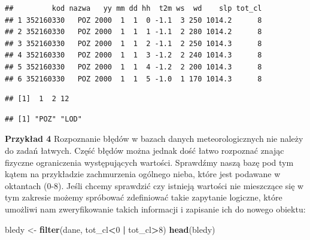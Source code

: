 \documentclass[]{book}
\newenvironment{Shaded}{\begin{snugshade}}{\end{snugshade}}
\newcommand{\KeywordTok}[1]{\textcolor[rgb]{0.13,0.29,0.53}{\textbf{#1}}}
\newcommand{\DecValTok}[1]{\textcolor[rgb]{0.00,0.00,0.81}{#1}}
\newcommand{\StringTok}[1]{\textcolor[rgb]{0.31,0.60,0.02}{#1}}
\newcommand{\CommentTok}[1]{\textcolor[rgb]{0.56,0.35,0.01}{\textit{#1}}}
\newcommand{\OperatorTok}[1]{\textcolor[rgb]{0.81,0.36,0.00}{\textbf{#1}}}
\newcommand{\NormalTok}[1]{#1}
\theoremstyle{definition}
\theoremstyle{definition}
\theoremstyle{definition}
\theoremstyle{remark}
\begin{document}
\begin{verbatim}
##         kod nazwa   yy mm dd hh  t2m ws  wd    slp tot_cl
## 1 352160330   POZ 2000  1  1  0 -1.1  3 250 1014.2      8
## 2 352160330   POZ 2000  1  1  1 -1.1  2 280 1014.2      8
## 3 352160330   POZ 2000  1  1  2 -1.1  2 250 1014.3      8
## 4 352160330   POZ 2000  1  1  3 -1.2  2 240 1014.3      8
## 5 352160330   POZ 2000  1  1  4 -1.2  2 200 1014.3      8
## 6 352160330   POZ 2000  1  1  5 -1.0  1 170 1014.3      8
\end{verbatim}

\begin{Shaded}
\end{Shaded}

\begin{verbatim}
## [1]  1  2 12
\end{verbatim}

\begin{Shaded}
\end{Shaded}

\begin{verbatim}
## [1] "POZ" "LOD"
\end{verbatim}

\textbf{Przykład 4} Rozpoznanie błędów w bazach danych meteorologicznych
nie należy do zadań łatwych. Część błędów można jednak dość łatwo
rozpoznać znając fizyczne ograniczenia występujących wartości. Sprawdźmy
naszą bazę pod tym kątem na przykładzie zachmurzenia ogólnego nieba,
które jest podawane w oktantach (0-8). Jeśli chcemy sprawdzić czy
istnieją wartości nie mieszczące się w tym zakresie możemy spróbować
zdefiniować takie zapytanie logiczne, które umożliwi nam zweryfikowanie
takich informacji i zapisanie ich do nowego obiektu:

\begin{Shaded}
\begin{Highlighting}[]
\NormalTok{bledy <-}\StringTok{ }\KeywordTok{filter}\NormalTok{(dane, tot_cl}\OperatorTok{<}\DecValTok{0} \OperatorTok{|}\StringTok{ }\NormalTok{tot_cl}\OperatorTok{>}\DecValTok{8}\NormalTok{)}
\KeywordTok{head}\NormalTok{(bledy)}
\end{Highlighting}
\end{Shaded}
\end{document}
